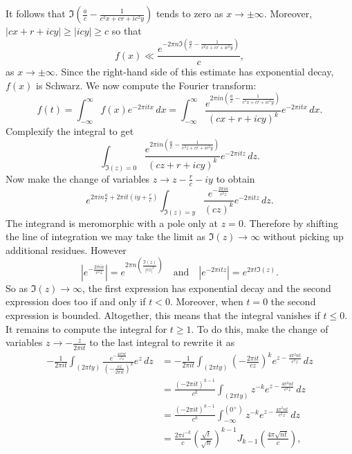     It follows that $\Im\left(\frac{a}{c}-\frac{1}{c^{2}x+cr+ic^{2}y}\right)$ tends to zero as $x \to \pm\infty$. Moreover, $|cx+r+icy| \ge |icy| \ge c$ so that
    \[
      f(x) \ll \frac{e^{-2\pi n\Im\left(\frac{a}{c}-\frac{1}{c^{2}x+cr+ic^{2}y}\right)}}{c},
    \]
    as $x \to \pm\infty$. Since the right-hand side of this estimate has exponential decay, $f(x)$ is Schwarz. We now compute the Fourier transform:
    \[
      \hat{f}(t) = \int_{-\infty}^{\infty}f(x)e^{-2\pi itx}\,dx = \int_{-\infty}^{\infty}\frac{e^{2\pi in\left(\frac{a}{c}-\frac{1}{c^{2}x+cr+ic^{2}y}\right)}}{(cx+r+icy)^{k}}e^{-2\pi itx}\,dx.
    \]
    Complexify the integral to get
    \[
      \int_{\Im(z) = 0}\frac{e^{2\pi in\left(\frac{a}{c}-\frac{1}{c^{2}z+cr+ic^{2}y}\right)}}{(cz+r+icy)^{k}}e^{-2\pi itz}\,dz.
    \]
    Now make the change of variables $z \to z-\frac{r}{c}-iy$ to obtain
    \[
      e^{2\pi in\frac{a}{c}+2\pi it\left(iy+\frac{r}{c}\right)}\int_{\Im(z) = y}\frac{e^{-\frac{2\pi in}{c^{2}z}}}{(cz)^{k}}e^{-2\pi itz}\,dz.
    \]
    The integrand is meromorphic with a pole only at $z = 0$. Therefore by shifting the line of integration we may take the limit as $\Im(z) \to \infty$ without picking up additional residues. However
    \[
      \left|e^{-\frac{2\pi in}{c^{2}z}}\right| = e^{2\pi n\left(\frac{\Im(z)}{|cz|^{2}}\right)} \quad \text{and} \quad \left|e^{-2\pi itz}\right| = e^{2\pi t\Im(z)}.
    \]
    So as $\Im(z) \to \infty$, the first expression has exponential decay and the second expression does too if and only if $t < 0$. Moreover, when $t = 0$ the second expression is bounded. Altogether, this means that the integral vanishes if $t \le 0$. It remains to compute the integral for $t \ge 1$. To do this, make the change of variables $z \to - \frac{z}{2\pi it}$ to the last integral to rewrite it as
    \begin{align*}
      -\frac{1}{2\pi it}\int_{(2\pi ty)}\frac{e^{-\frac{4\pi^{2}nt}{c^{2}z}}}{\left(-\frac{cz}{2\pi it}\right)^{k}}e^{z}\,dz &= -\frac{1}{2\pi it}\int_{(2\pi ty)}\left(-\frac{2\pi it}{cz}\right)^{k}e^{z-\frac{4\pi^{2}nt}{c^{2}z}}\,dz \\
      &= \frac{(-2\pi it)^{k-1}}{c^{k}}\int_{(2\pi ty)}z^{-k}e^{z-\frac{4\pi^{2}nt}{c^{2}z}}\,dz \\
      &= \frac{(-2\pi it)^{k-1}}{c^{k}}\int_{-\infty}^{(0^{+})}z^{-k}e^{z-\frac{4\pi^{2}nt}{c^{2}z}}\,dz \\
      &= \frac{2\pi i^{-k}}{c}\left(\frac{\sqrt{t}}{\sqrt{n}}\right)^{k-1}J_{k-1}\left(\frac{4\pi\sqrt{nt}}{c}\right),
    \end{align*}
